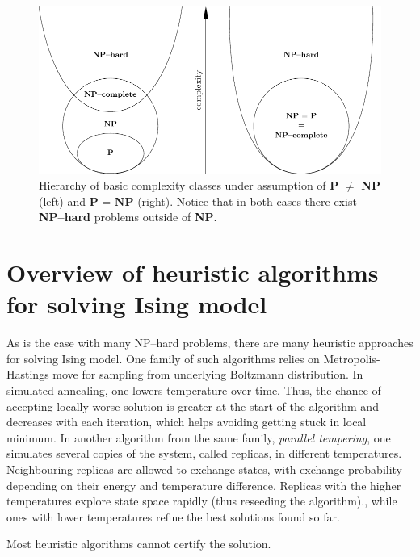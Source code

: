 \begin{figure}
    \includegraphics{figures/complexity.pdf}
    \caption{Hierarchy of basic complexity classes under assumption of \textbf{P} $\ne$ \textbf{NP} (left) and \textbf{P} = \textbf{NP} (right). Notice that in both cases there exist \textbf{NP--hard} problems outside of \textbf{NP}.}
    \label{fig:complexity}
\end{figure}



\section{Overview of heuristic algorithms for solving Ising model}

As is the case with many NP--hard problems, there are many heuristic approaches for solving Ising model. One family of such algorithms relies on Metropolis-Hastings move for sampling from underlying Boltzmann distribution. In simulated annealing, one lowers temperature over time. Thus, the chance of accepting locally worse solution is greater at the start of the algorithm and decreases with each iteration, which helps avoiding getting stuck in local minimum. In another algorithm from the same family, \emph{parallel tempering}, one simulates several copies of the system, called replicas, in different temperatures. Neighbouring replicas are allowed to exchange states, with exchange probability depending on their energy and temperature difference. Replicas with the higher temperatures explore state space rapidly (thus reseeding the algorithm)., while ones with lower temperatures refine the best solutions found so far.

Most heuristic algorithms cannot certify the solution. 

